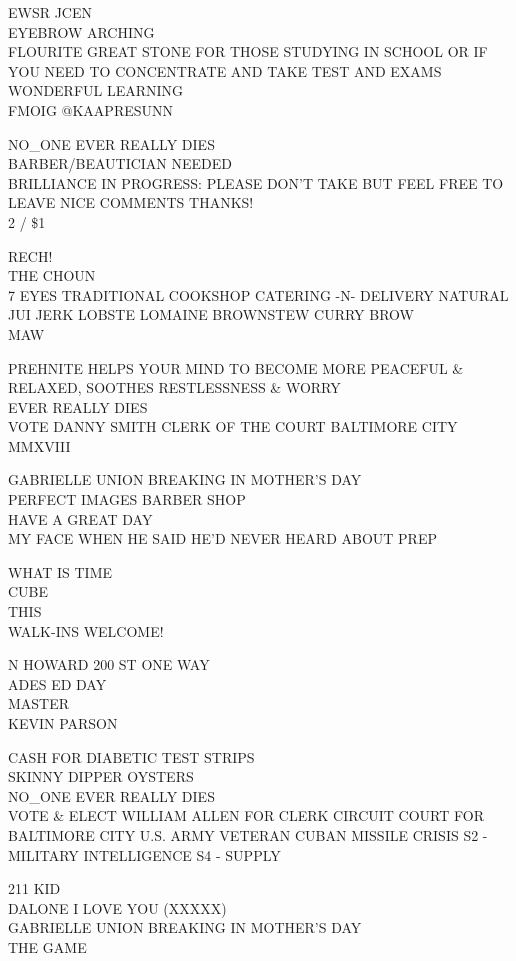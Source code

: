 \documentclass[10pt,letterpaper]{article}
\begin{document}
EWSR JCEN\\
EYEBROW ARCHING\\
FLOURITE GREAT STONE FOR THOSE STUDYING IN SCHOOL OR IF YOU NEED TO CONCENTRATE AND TAKE TEST AND EXAMS WONDERFUL LEARNING\\
FMOIG @KAAPRESUNN

NO\_ONE EVER  REALLY DIES\\
BARBER/BEAUTICIAN NEEDED\\
BRILLIANCE IN PROGRESS: PLEASE DON'T TAKE BUT FEEL FREE TO LEAVE NICE COMMENTS THANKS!\\
2 / \$1

RECH!\\
THE CHOUN\\
7 EYES TRADITIONAL COOKSHOP CATERING {-}N{-} DELIVERY NATURAL JUI JERK LOBSTE LOMAINE BROWNSTEW CURRY BROW\\
MAW

PREHNITE HELPS YOUR MIND TO BECOME MORE PEACEFUL \& RELAXED, SOOTHES RESTLESSNESS \& WORRY\\
EVER REALLY DIES\\
VOTE DANNY SMITH CLERK OF THE COURT BALTIMORE CITY\\
MMXVIII

GABRIELLE UNION BREAKING IN MOTHER'S DAY\\
PERFECT IMAGES BARBER SHOP\\
HAVE A GREAT DAY\\
MY FACE WHEN HE SAID HE'D NEVER HEARD ABOUT PREP

WHAT IS TIME\\
CUBE\\
THIS\\
WALK{-}INS WELCOME!

N HOWARD 200 ST ONE WAY\\
ADES ED DAY\\
MASTER\\
KEVIN PARSON

CASH FOR DIABETIC TEST STRIPS\\
SKINNY DIPPER OYSTERS\\
NO\_ONE EVER REALLY DIES\\
VOTE \& ELECT WILLIAM ALLEN FOR CLERK CIRCUIT COURT FOR BALTIMORE CITY U.S. ARMY VETERAN CUBAN MISSILE CRISIS S2 {-} MILITARY INTELLIGENCE S4 {-} SUPPLY

211 KID\\
DALONE I LOVE YOU (XXXXX)\\
GABRIELLE UNION BREAKING IN MOTHER'S DAY\\
THE GAME
\end{document}
